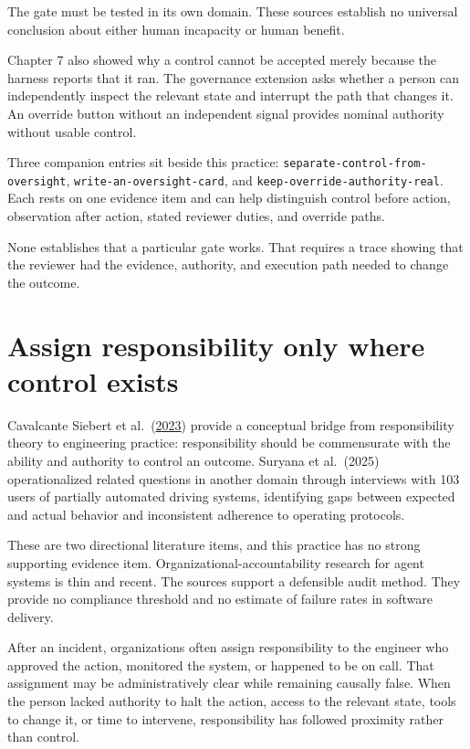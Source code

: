 The gate must be tested in its own domain. These sources establish no universal conclusion about either human incapacity or human benefit.

Chapter 7 also showed why a control cannot be accepted merely because the harness reports that it ran. The governance extension asks whether a person can independently inspect the relevant state and interrupt the path that changes it. An override button without an independent signal provides nominal authority without usable control.

Three companion entries sit beside this practice: \texttt{separate-control-from-oversight}, \texttt{write-an-oversight-card}, and \texttt{keep-override-authority-real}. Each rests on one evidence item and can help distinguish control before action, observation after action, stated reviewer duties, and override paths.

None establishes that a particular gate works. That requires a trace showing that the reviewer had the evidence, authority, and execution path needed to change the outcome.

\hypertarget{assign-responsibility-only-where-control-exists}{%
\section{Assign responsibility only where control exists}\label{assign-responsibility-only-where-control-exists}}

Cavalcante Siebert et al.~(\href{https://arxiv.org/abs/2112.01298}{2023}) provide a conceptual bridge from responsibility theory to engineering practice: responsibility should be commensurate with the ability and authority to control an outcome. Suryana et al.~(2025) operationalized related questions in another domain through interviews with 103 users of partially automated driving systems, identifying gaps between expected and actual behavior and inconsistent adherence to operating protocols.

These are two directional literature items, and this practice has no strong supporting evidence item. Organizational-accountability research for agent systems is thin and recent. The sources support a defensible audit method. They provide no compliance threshold and no estimate of failure rates in software delivery.

After an incident, organizations often assign responsibility to the engineer who approved the action, monitored the system, or happened to be on call. That assignment may be administratively clear while remaining causally false. When the person lacked authority to halt the action, access to the relevant state, tools to change it, or time to intervene, responsibility has followed proximity rather than control.

